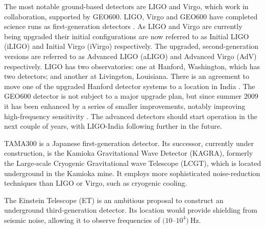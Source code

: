 The most notable ground-based detectors are LIGO and Virgo, which work in collaboration, supported by GEO600. LIGO, Virgo and GEO600 have completed science runs as first-generation detectors \citep[e.g.,][]{Abadie2010}. As LIGO and Virgo are currently being upgraded their initial configurations are now referred to as Initial LIGO (iLIGO) and Initial Virgo (iVirgo) respectively. The upgraded, second-generation versions are referred to as Advanced LIGO (aLIGO) and Advanced Virgo (AdV) respectively. LIGO has two observatories: one at Hanford, Washington, which has two detectors; and another at Livingston, Louisiana. There is an agreement to move one of the upgraded Hanford detector systems to a location in India \citep{LIGO-India,Unnikrishnan2013}. The GEO600 detector is not subject to a major upgrade plan, but since summer 2009 it has been enhanced by a series of smaller improvements, notably improving high-frequency sensitivity \citep[GEO-HF;][]{2006CQGra..23S.207W}. The advanced detectors should start operation in the next couple of years, with LIGO-India following further in the future.

TAMA300 is a Japanese first-generation detector. Its successor, currently under construction, is the Kamioka Gravitational Wave Detector (KAGRA), formerly the Large-scale Cryogenic Gravitational wave Telescope (LCGT), which is located underground in the Kamioka mine. It employs more sophisticated noise-reduction techniques than LIGO or Virgo, such as cryogenic cooling.

The Einstein Telescope (ET) is an ambitious proposal to construct an underground third-generation detector. Its location would provide shielding from seismic noise, allowing it to observe frequencies of $(10$--$10^4)~\mathrm{Hz}$. 

